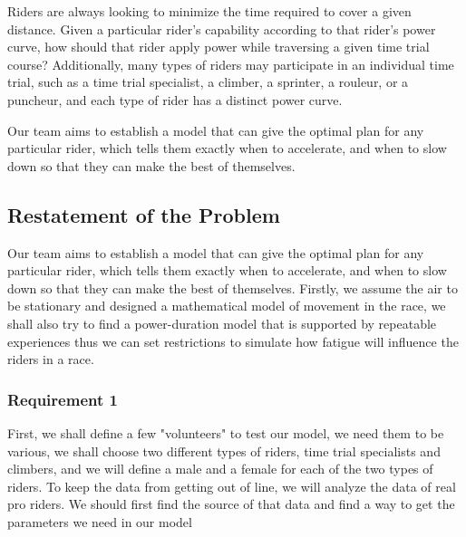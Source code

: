 \documentclass[12pt]{article}
\begin{document}
Riders are always looking to minimize the time required to cover a given distance. Given a
particular rider's capability according to that rider's power curve, how should that rider apply
power while traversing a given time trial course? Additionally, many types of riders may
participate in an individual time trial, such as a time trial specialist, a climber, a sprinter, a
rouleur, or a puncheur, and each type of rider has a distinct power curve.

Our team aims to establish a model that can give the optimal plan for any particular rider, which tells them exactly when to accelerate,
and when to slow down so that they can make the best of themselves.

\subsection{Restatement of the Problem}
Our team aims to establish a model that can give the optimal plan for any particular rider, which tells them exactly when to accelerate,
and when to slow down so that they can make the best of themselves. Firstly, we assume the air to be stationary and designed a mathematical model of movement
in the race, we shall also try to find a power-duration model that is supported by repeatable experiences thus we can set restrictions to simulate how fatigue
will influence the riders in a race.

\subsubsection{Requirement 1}
First, we shall define a few "volunteers" to test our model, we need them to be various, we shall choose two different types of riders, time trial
specialists and climbers, and we will define a male and a female for each of the two types of riders. To keep the data from getting out of line, we will analyze the data of
real pro riders. We should first find the source of that data and find a way to get the parameters we need in our model
\end{document}
